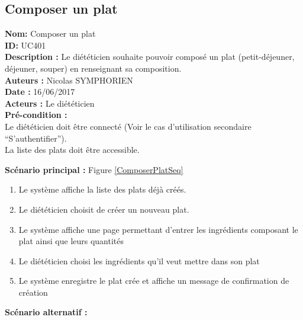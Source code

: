 \subsection{Composer un plat}

\noindent \textbf{Nom:} Composer un plat \\
\textbf{ID:} UC401\\
\textbf{Description :} Le diététicien souhaite pouvoir composé un plat (petit-déjeuner, déjeuner, souper) en renseignant sa composition.\\
\textbf{Auteurs :} Nicolas SYMPHORIEN\\
\textbf{Date :} 16/06/2017 \\
\textbf{Acteurs :} Le diététicien \\
\textbf{Pré-condition :} \\
Le diététicien doit être connecté (Voir le cas d'utilisation secondaire ``S'authentifier''). \\
La liste des plats doit être accessible.

\noindent \textbf{Scénario principal : } Figure \ref{ComposerPlatSeq}

\begin{enumerate}
	\item \label{UC401_step1}Le système affiche la liste des plats déjà créés.
	\item \label{UC401_step2}Le diététicien choisit de créer un nouveau plat.
	\item Le système affiche une page permettant d'entrer les ingrédients composant le plat ainsi que leurs quantités
	\item Le diététicien choisi les ingrédients qu'il veut mettre dans son plat
	\item Le système enregistre le plat crée et affiche un message de confirmation de création
\end{enumerate}

 \noindent \textbf{Scénario alternatif :}

